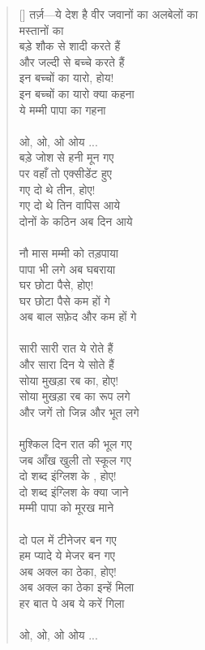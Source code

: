 \begin{verse}[\versewidth]\texthindi{
तर्ज़—ये देश है वीर जवानों का अलबेलों का\\
मस्तानों का\\
बड़े शौक से शादी करते हैं\\
और जल्दी से बच्चे करते हैं\\
इन बच्चों का यारो, होय!\\
इन बच्चों का यारो क्या कहना\\
ये मम्मी पापा का गहना\\
\\
ओ, ओ, ओ ओय ...\\
बड़े जोश से हनी मून गए\\
पर वहाँ तो एक्सीडेंट हुए\\
गए दो थे तीन, होए!\\
गए दो थे तिन वापिस आये\\
दोनों के कठिन अब दिन आये\\
\\
नौ मास मम्मी को तड़पाया\\
पापा भी लगे अब घबराया\\
घर छोटा पैसे, होए!\\
घर छोटा पैसे कम हों गे\\
अब बाल सफ़ेद और कम हों गे\\
\\
सारी सारी रात ये रोते हैं\\
और सारा दिन ये सोते हैं\\
सोया मुखड़ा रब का, होए!\\
सोया मुखड़ा रब का रूप लगे\\
और जगें तो जिन्न और भूत लगे\\
\\
मुश्किल दिन रात की भूल गए\\
जब आँख खुली तो स्कूल गए\\
दो शब्द इंग्लिश के , होए!\\
दो शब्द इंग्लिश के क्या जाने\\
मम्मी पापा को मूरख माने\\
\\
दो पल में टीनेजर बन गए\\
हम प्यादे ये मेजर बन गए\\
अब अक्ल का ठेका, होए!\\
अब अक्ल का ठेका इन्हें मिला\\
हर बात पे अब ये करें गिला\\
\\
ओ, ओ, ओ ओय ... \\
}
\end{verse}
